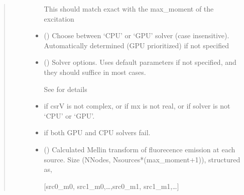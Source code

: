 \documentclass[letterpaper,10pt,english]{sphinxmanual}
\begin{document}
\begin{fulllineitems}
\begin{quote}
\begin{description}
\begin{itemize}
\sphinxAtStartPar
This should match exact with the max\_moment of the excitation


\item {} 
\sphinxAtStartPar
{} (\sphinxstyleliteralemphasis{\sphinxupquote{, }}) \textendash{} Choose between ‘CPU’ or ‘GPU’ solver (case insensitive). Automatically determined (GPU prioritized) if not specified

\item {} 
\sphinxAtStartPar
{} ({\hyperref[\detokenize{_autosummary/nirfasterff.utils.SolverOptions:nirfasterff.utils.SolverOptions}]{}}\sphinxstyleliteralemphasis{\sphinxupquote{, }}) \textendash{} 
\sphinxAtStartPar
Solver options. Uses default parameters if not specified, and they should suffice in most cases.

\sphinxAtStartPar
See {\hyperref[\detokenize{_autosummary/nirfasterff.utils.SolverOptions:nirfasterff.utils.SolverOptions}]{}} for details


\end{itemize}

\begin{itemize}
\item {} 
\sphinxAtStartPar
{} \textendash{} if csrV is not complex, or if mx is not real, or if solver is not ‘CPU’ or ‘GPU’.

\item {} 
\sphinxAtStartPar
{} \textendash{} if both GPU and CPU solvers fail.

\end{itemize}

\sphinxAtStartPar
\begin{itemize}
\item {} 
\sphinxAtStartPar
{} () \textendash{} Calculated Mellin transform of fluorecence emission at each source. Size (NNodes, Nsources*(max\_moment+1)), structured as,

\sphinxAtStartPar
{[}src0\_m0, src1\_m0,…,src0\_m1, src1\_m1,…{]}


\end{itemize}
\end{description}
\end{quote}
\end{fulllineitems}
\end{document}
